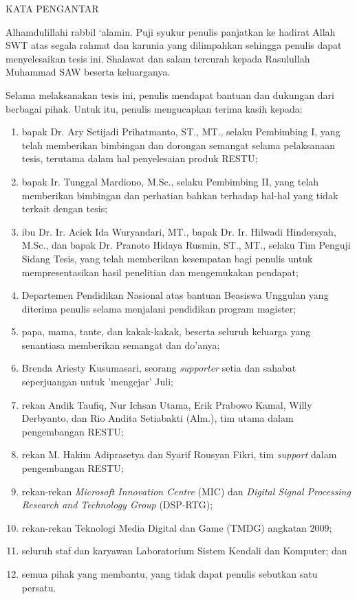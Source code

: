 \begin{center}
\large{KATA PENGANTAR}
\end{center}

Alhamdulillahi rabbil ‘alamin. Puji syukur penulis panjatkan ke hadirat Allah SWT atas segala rahmat dan karunia yang dilimpahkan sehingga penulis dapat menyelesaikan tesis ini. Shalawat dan salam tercurah kepada Rasulullah Muhammad SAW beserta keluarganya.

Selama melaksanakan tesis ini, penulis mendapat bantuan dan dukungan dari berbagai pihak. Untuk itu, penulis  mengucapkan terima kasih kepada:

\begin{enumerate}
\item bapak Dr. Ary Setijadi Prihatmanto, ST., MT., selaku Pembimbing I, yang telah memberikan bimbingan dan dorongan semangat selama pelaksanaan tesis, terutama dalam hal penyelesaian produk RESTU;
\item bapak Ir. Tunggal Mardiono, M.Sc., selaku Pembimbing II, yang telah memberikan bimbingan dan perhatian bahkan terhadap hal-hal yang tidak terkait dengan tesis;
\item ibu Dr. Ir. Aciek Ida Wuryandari, MT., bapak Dr. Ir. Hilwadi Hindersyah, M.Sc., dan bapak Dr. Pranoto Hidaya Rusmin, ST., MT., selaku Tim Penguji Sidang Tesis, yang telah memberikan kesempatan bagi penulis
untuk mempresentasikan hasil penelitian dan mengemukakan pendapat;
\item Departemen Pendidikan Nasional atas bantuan Beasiswa Unggulan yang diterima penulis selama menjalani pendidikan program magister;
\item papa, mama, tante, dan kakak-kakak, beserta seluruh keluarga yang senantiasa memberikan semangat dan do’anya;
\item Brenda Ariesty Kusumasari, seorang \textit{supporter} setia dan sahabat seperjuangan untuk 'mengejar' Juli;
\item rekan Andik Taufiq, Nur Ichsan Utama, Erik Prabowo Kamal, Willy Derbyanto, dan Rio Andita Setiabakti (Alm.), tim utama dalam pengembangan RESTU;
\item rekan M. Hakim Adiprasetya dan Syarif Rousyan Fikri, tim \textit{support} dalam pengembangan RESTU;
\item rekan-rekan \textit{Microsoft Innovation Centre} (MIC) dan \textit{Digital Signal Processing Research and Technology Group} (DSP-RTG);
\item rekan-rekan Teknologi Media Digital dan Game (TMDG) angkatan 2009;
\item seluruh staf dan karyawan Laboratorium Sistem Kendali dan Komputer; dan
\item semua pihak yang membantu, yang tidak dapat penulis sebutkan satu persatu.
\end{enumerate}


